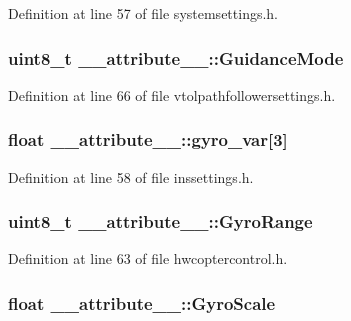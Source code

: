 \-Definition at line 57 of file systemsettings.\-h.

\hypertarget{struct____attribute_____aa0f37e1b7770dd8db7cf3baaa07e1174}{
\subsubsection[{\-Guidance\-Mode}]{\setlength{\rightskip}{0pt plus 5cm}uint8\-\_\-t {\bf \-\_\-\-\_\-attribute\-\_\-\-\_\-\-::\-Guidance\-Mode}}}\label{struct____attribute_____aa0f37e1b7770dd8db7cf3baaa07e1174}


\-Definition at line 66 of file vtolpathfollowersettings.\-h.

\hypertarget{struct____attribute_____acbeb3de4be2e299c95b047aa483707ce}{
\subsubsection[{gyro\-\_\-var}]{\setlength{\rightskip}{0pt plus 5cm}float {\bf \-\_\-\-\_\-attribute\-\_\-\-\_\-\-::gyro\-\_\-var}\mbox{[}3\mbox{]}}}\label{struct____attribute_____acbeb3de4be2e299c95b047aa483707ce}


\-Definition at line 58 of file inssettings.\-h.

\hypertarget{struct____attribute_____ac0eb1414736a20193d07da3b5357e3e8}{
\subsubsection[{\-Gyro\-Range}]{\setlength{\rightskip}{0pt plus 5cm}uint8\-\_\-t {\bf \-\_\-\-\_\-attribute\-\_\-\-\_\-\-::\-Gyro\-Range}}}\label{struct____attribute_____ac0eb1414736a20193d07da3b5357e3e8}


\-Definition at line 63 of file hwcoptercontrol.\-h.

\hypertarget{struct____attribute_____a641633408758bb48296a0dd11ad3e1e5}{
\subsubsection[{\-Gyro\-Scale}]{\setlength{\rightskip}{0pt plus 5cm}float {\bf \-\_\-\-\_\-attribute\-\_\-\-\_\-\-::\-Gyro\-Scale}}}\label{struct____attribute_____a641633408758bb48296a0dd11ad3e1e5}


